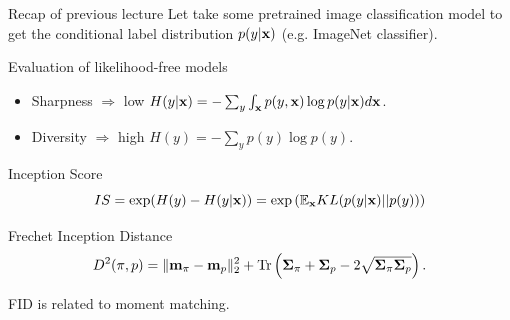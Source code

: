 

\begin{frame}
\titlepage
\end{frame}
\begin{frame}{Recap of previous lecture}
	Let take some pretrained image classification model to get the conditional label distribution $p(y | \mathbf{x})$ (e.g. ImageNet classifier).
	\begin{block}{Evaluation of likelihood-free models}
		\begin{itemize}
			\item Sharpness $\Rightarrow$ low $H(y | \mathbf{x}) = - \sum_{y} \int_{\mathbf{x}} p(y, \mathbf{x}) \log p(y | \mathbf{x}) d\mathbf{x}$.
			\item Diversity $\Rightarrow$ high $H(y)  = - \sum_{y} p(y) \log p(y)$.
		\end{itemize}
	\end{block}
	\vspace{-0.3cm}
	\begin{block}{Inception Score}
		\vspace{-0.2cm}
		\[
			IS = \exp(H(y) - H(y | \mathbf{x})) = \exp \left( \mathbb{E}_{\mathbf{x}} KL(p(y | \mathbf{x}) || p(y)) \right)
		\]
		\vspace{-0.5cm}
	\end{block}
	\begin{block}{Frechet Inception Distance}
		\vspace{-0.3cm}
		\[
			D^2 (\pi, p) = \| \mathbf{m}_{\pi} - \mathbf{m}_{p}\|_2^2 + \text{Tr} \left( \boldsymbol{\Sigma}_{\pi} + \boldsymbol{\Sigma}_p - 2 \sqrt{\boldsymbol{\Sigma}_{\pi} \boldsymbol{\Sigma}_p} \right).
		\]
		\vspace{-0.5cm}
	\end{block}
	FID is related to moment matching.
	
\end{frame}
